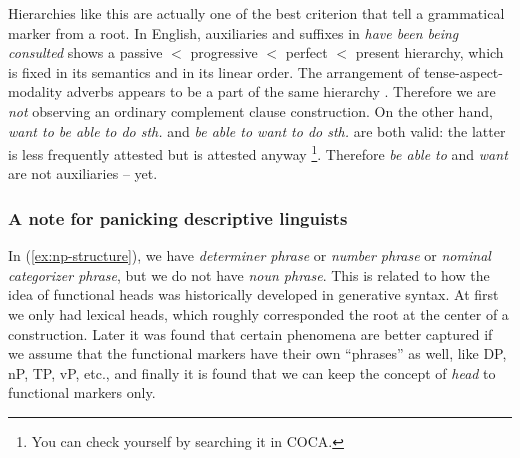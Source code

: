 \documentclass[a4paper, oneside, scheme=plain, 12pt]{article}
\newcommand*{\term}[1]{\emph{#1}}
\newcommand{\form}[1]{\emph{#1}}
\newcommand*{\textlt}{$<$ }
\begin{document}
Hierarchies like this are actually one of the best criterion that tell a grammatical marker from a root.
In English, auxiliaries and suffixes in \form{have been being consulted} 
shows a passive \textlt progressive \textlt perfect \textlt present hierarchy,
which is fixed in its semantics and in its linear order.
The arrangement of tense-aspect-modality adverbs appears to be a part of the same hierarchy \citep{cinque1999adverbs}.
Therefore we are \emph{not} observing an ordinary complement clause construction.
On the other hand, \form{want to be able to do sth.}
and \form{be able to want to do sth.} are both valid:
the latter is less frequently attested but is attested anyway%
\footnote{
    You can check yourself by searching it in COCA.
}.
Therefore \form{be able to} and \form{want} are not auxiliaries -- yet.

\subsubsection{A note for panicking descriptive linguists}\label{sec:remove-functional-heads}

In (\ref{ex:np-structure}), we have \term{determiner phrase} or \term{number phrase} or \term{nominal categorizer phrase},
but we do not have \term{noun phrase}.
This is related to how the idea of functional heads was historically developed in generative syntax.
At first we only had lexical heads, which roughly corresponded the root at the center of a construction.
Later it was found that certain phenomena are better captured
if we assume that the functional markers have their own ``phrases'' as well,
like DP, nP, TP, vP, etc.,
and finally it is found that we can keep the concept of \term{head} to functional markers only.
\end{document}
